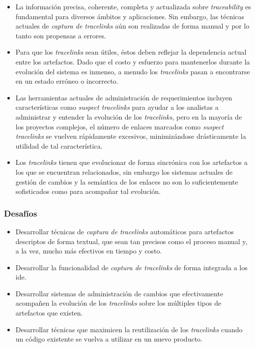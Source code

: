 \documentclass[a4paper,12pt,oneside,spanish]{book}
\begin{document}
\begin{itemize}[label={$\times$}]

\item La información precisa, coherente, completa y actualizada sobre \textit{traceability} es fundamental para diversos ámbitos y aplicaciones. Sin embargo, las técnicas actuales de \textit{captura de tracelinks} aún son realizadas de forma manual y por lo tanto son propensas a errores.

\item Para que los \textit{tracelinks} sean útiles, éstos deben reflejar la dependencia actual entre los artefactos. Dado que el costo y esfuerzo para mantenerlos durante la evolución del sistema es inmenso, a menudo los \textit{tracelinks} pasan a encontrarse en un estado erróneo o incorrecto.

\item Las herramientas actuales de administración de requerimientos incluyen características como \textit{suspect tracelinks} para ayudar a los analistas a administrar y entender la evolución de los \textit{tracelinks}, pero en la mayoría de los proyectos complejos, el número de enlaces marcados como \textit{suspect tracelinks} se vuelven rápidamente excesivos, minimizándose drásticamente la utilidad de tal característica.
 
\item Los \textit{tracelinks} tienen que evolucionar de forma sincrónica con los artefactos a los que se encuentran relacionados, sin embargo los sistemas actuales de gestión de cambios y la semántica de los enlaces no son lo suficientemente sofisticados como para acompañar tal evolución.

\end{itemize}

\subsubsection{Desafíos}

\begin{itemize}[label={\checkmark}]

\item Desarrollar técnicas de \textit{captura de tracelinks} automáticos para artefactos descriptos de forma textual, que sean tan precisos como el proceso manual y, a la vez, mucho más efectivos en tiempo y costo.

\item Desarrollar la funcionalidad de \textit{captura de tracelinks} de forma integrada a los \gls{ide}.

\item Desarrollar sistemas de administración de cambios que efectivamente acompañen la evolución de los \textit{tracelinks} sobre los múltiples tipos de artefactos que existen.

\item Desarrollar técnicas que maximicen la reutilización de los \textit{tracelinks} cuando un código existente se vuelva a utilizar en un nuevo producto.

\end{itemize}
\end{document}
